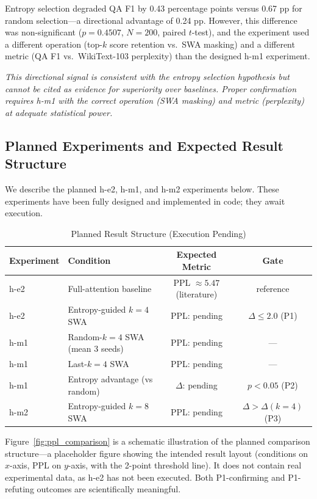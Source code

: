 Entropy selection degraded QA F1 by 0.43 percentage points versus 0.67 pp for random selection---a directional advantage of 0.24 pp. However, this difference was non-significant ($p = 0.4507$, $N = 200$, paired $t$-test), and the experiment used a different operation (top-$k$ score retention vs.\ SWA masking) and a different metric (QA F1 vs.\ WikiText-103 perplexity) than the designed h-m1 experiment.

\textit{This directional signal is consistent with the entropy selection hypothesis but cannot be cited as evidence for superiority over baselines. Proper confirmation requires h-m1 with the correct operation (SWA masking) and metric (perplexity) at adequate statistical power.}

\subsection{Planned Experiments and Expected Result Structure}

We describe the planned h-e2, h-m1, and h-m2 experiments below. These experiments have been fully designed and implemented in code; they await execution.

\begin{table}[h]
\centering
\caption{Planned Result Structure (Execution Pending)}
\label{tab:planned}
\begin{tabular}{llcc}
\toprule
Experiment & Condition & Expected Metric & Gate \\
\midrule
h-e2 & Full-attention baseline & PPL $\approx 5.47$ (literature) & reference \\
h-e2 & Entropy-guided $k=4$ SWA & PPL: pending & $\Delta \leq 2.0$ (P1) \\
h-m1 & Random-$k=4$ SWA (mean 3 seeds) & PPL: pending & --- \\
h-m1 & Last-$k=4$ SWA & PPL: pending & --- \\
h-m1 & Entropy advantage (vs random) & $\Delta$: pending & $p < 0.05$ (P2) \\
h-m2 & Entropy-guided $k=8$ SWA & PPL: pending & $\Delta > \Delta(k=4)$ (P3) \\
\bottomrule
\end{tabular}
\end{table}

Figure~\ref{fig:ppl_comparison} is a schematic illustration of the planned comparison structure---a placeholder figure showing the intended result layout (conditions on $x$-axis, PPL on $y$-axis, with the 2-point threshold line). It does not contain real experimental data, as h-e2 has not been executed. Both P1-confirming and P1-refuting outcomes are scientifically meaningful.
